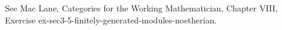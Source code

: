 See Mac Lane, Categories for the Working Mathematician, Chapter VIII, Exercise ex-sec3-5-finitely-generated-modules-noetherian.
